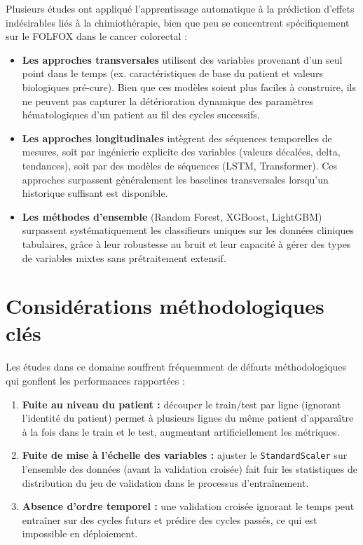 \documentclass[12pt,a4paper]{report}
\begin{document}
Plusieurs études ont appliqué l'apprentissage automatique à la prédiction d'effets indésirables liés à la chimiothérapie, bien que peu se concentrent spécifiquement sur le FOLFOX dans le cancer colorectal :

\begin{itemize}
  \item \textbf{Les approches transversales} utilisent des variables provenant d'un seul point dans le temps (ex. caractéristiques de base du patient et valeurs biologiques pré-cure). Bien que ces modèles soient plus faciles à construire, ils ne peuvent pas capturer la détérioration dynamique des paramètres hématologiques d'un patient au fil des cycles successifs.
  \item \textbf{Les approches longitudinales} intègrent des séquences temporelles de mesures, soit par ingénierie explicite des variables (valeurs décalées, delta, tendances), soit par des modèles de séquences (LSTM, Transformer). Ces approches surpassent généralement les baselines transversales lorsqu'un historique suffisant est disponible.
  \item \textbf{Les méthodes d'ensemble} (Random Forest, XGBoost, LightGBM) surpassent systématiquement les classifieurs uniques sur les données cliniques tabulaires, grâce à leur robustesse au bruit et leur capacité à gérer des types de variables mixtes sans prétraitement extensif.
\end{itemize}

\section{Considérations méthodologiques clés}

Les études dans ce domaine souffrent fréquemment de défauts méthodologiques qui gonflent les performances rapportées :
\begin{enumerate}
  \item \textbf{Fuite au niveau du patient :} découper le train/test par ligne (ignorant l'identité du patient) permet à plusieurs lignes du même patient d'apparaître à la fois dans le train et le test, augmentant artificiellement les métriques.
  \item \textbf{Fuite de mise à l'échelle des variables :} ajuster le \texttt{StandardScaler} sur l'ensemble des données (avant la validation croisée) fait fuir les statistiques de distribution du jeu de validation dans le processus d'entraînement.
  \item \textbf{Absence d'ordre temporel :} une validation croisée ignorant le temps peut entraîner sur des cycles futurs et prédire des cycles passés, ce qui est impossible en déploiement.
\end{enumerate}
\end{document}
